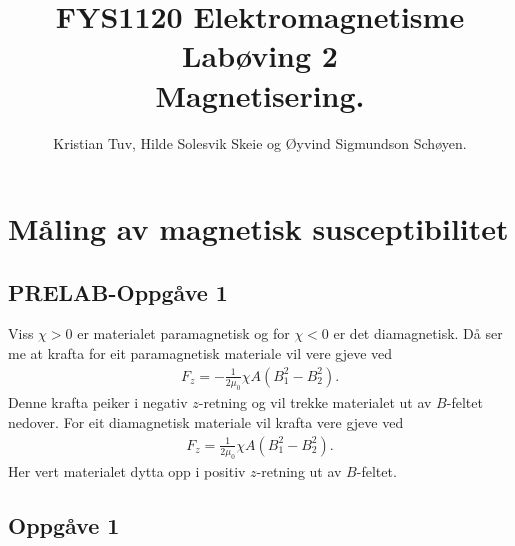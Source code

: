 \documentclass[11pt, a4paper]{article}
\begin{document}
\begin{titlepage}

  \title{\normalsize FYS1120 Elektromagnetisme\\
    \vspace{10mm}
    \huge Labøving 2\\
    \vspace{10mm}
    \normalsize{\bf Magnetisering.}}

  \author{Kristian Tuv, Hilde Solesvik Skeie og Øyvind Sigmundson Schøyen.}

\end{titlepage}

\maketitle

\newpage
  \tableofcontents
\newpage

\section*{Måling av magnetisk susceptibilitet}

  \subsection*{PRELAB-Oppgåve 1}
    Viss $\chi > 0$ er materialet paramagnetisk og for $\chi < 0$ er det diamagnetisk. Då ser me at krafta for eit paramagnetisk materiale vil vere gjeve ved
    \begin{align*}
      F_z = -\frac{1}{2\mu_0}\chi A\left( B_1^2 - B_2^2 \right).
    \end{align*}
    Denne krafta peiker i negativ $z$-retning og vil trekke materialet ut av $B$-feltet nedover.
    For eit diamagnetisk materiale vil krafta vere gjeve ved
    \begin{align*}
      F_z = \frac{1}{2\mu_0}\chi A\left( B_1^2 - B_2^2 \right).
    \end{align*}
    Her vert materialet dytta opp i positiv $z$-retning ut av $B$-feltet.


  \subsection*{Oppgåve 1}


\newpage
\end{document}

